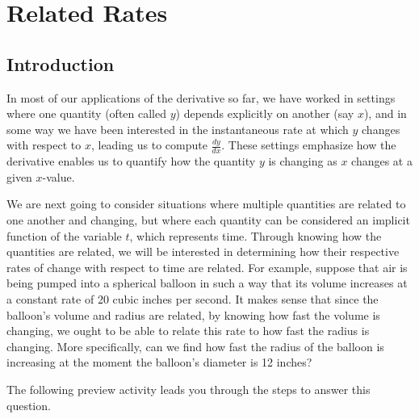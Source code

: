 \section{Related Rates} \label{S:3.5.RelatedRates}

\vspace*{-14 pt}

\subsection*{Introduction}

In most of our applications of the derivative so far, we have worked in settings where one quantity (often called $y$) depends explicitly on another (say $x$), and in some way we have been interested in the instantaneous rate at which $y$ changes with respect to $x$, leading us to compute $\frac{dy}{dx}$.  These settings emphasize how the derivative enables us to quantify how the quantity $y$ is changing as $x$ changes at a given $x$-value.

We are next going to consider situations where multiple quantities are related to one another and changing, but where each quantity can be considered an implicit function of the variable $t$, which represents time.  Through knowing how the quantities are related, we will be interested in determining how their respective rates of change with respect to time are related.  For example, suppose that air is being pumped into a spherical balloon in such a way that its volume increases at a constant rate of 20 cubic inches per second.  It makes sense that since the balloon's volume and radius are related, by knowing how fast the volume is changing, we ought to be able to relate this rate to how fast the radius is changing.  More specifically, can we find how fast the radius of the balloon is increasing at the moment the balloon's diameter is 12 inches?

The following preview activity leads you through the steps to answer this question.


